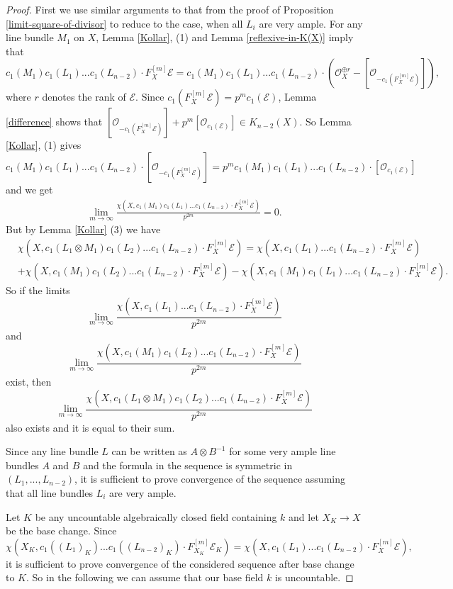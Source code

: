 \documentclass[twoside, 11pt]{article}
\theoremstyle{plain}
\theoremstyle{definition}
\theoremstyle{remark}
\newcommand{\cE}{{\mathcal E}}
\newcommand{\cO}{{\mathcal O}}
\begin{document}
\begin{proof}
First we use similar arguments to that from the proof of Proposition \ref{limit-square-of-divisor} to reduce to the case, when all $L_i$ are very ample.
For any line bundle $M_1$ on $X$, Lemma \ref{Kollar}, (1) and Lemma \ref{reflexive-in-K(X)} imply that
$$c_1(M_1)c_1(L_1)...c_1(L_{n-2}) \cdot {F_X^{[m]}\cE} =c_1(M_1)c_1(L_1)...c_1(L_{n-2}) \cdot 
(\cO_X^{\oplus r}-[\cO_{ -c_1(F_X^{[m]}\cE )}] ) ,$$
 where $r$ denotes the rank of $\cE$.
Since $c_1(F_X^{[m]}\cE ) =p^mc_1 (\cE)$, Lemma \ref{difference} shows that $[\cO_{ -c_1(F_X^{[m]}\cE )}] +p^m
[\cO_{c_1 (\cE)}]\in K_{n-2}(X)$. So Lemma  \ref{Kollar}, (1) gives
$$c_1(M_1)c_1(L_1)...c_1(L_{n-2}) \cdot  [\cO_{ -c_1(F_X^{[m]}\cE )}] =p^mc_1(M_1)c_1(L_1)...c_1(L_{n-2}) \cdot  [\cO_{ c_1(\cE )}] $$
and  we get
\begin{align*}
\lim _{m\to \infty}\frac{\chi (X,  c_1(M_1)c_1(L_1)...c_1(L_{n-2}) \cdot {F_X^{[m]}\cE} )}{p^{2m}}
=0.
\end{align*}
But by Lemma \ref{Kollar} (3) we have
\begin{align*}
&{  \chi (X, c_1(L_1\otimes M_1)c_1(L_2)...c_1(L_{n-2}) \cdot  {F_X^{[m]}\cE}  ) }
={  \chi (X, c_1(L_1)...c_1(L_{n-2}) \cdot {F_X^{[m]}\cE}   ) }\\
&+ \chi (X, c_1(M_1)c_1(L_2)...c_1(L_{n-2}) \cdot {F_X^{[m]}\cE}  ) - 
 {  \chi (X, c_1(M_1)c_1(L_1)...c_1(L_{n-2}) \cdot {F_X^{[m]}\cE}  ) }.
\end{align*}
So if  the limits $$\lim _{m\to \infty }\frac {  \chi (X, c_1(L_1)...c_1(L_{n-2}) \cdot {F_X^{[m]}\cE}  ) }{p^{2m}}$$ and 
$$\lim _{m\to \infty }\frac {  \chi (X, c_1(M_1)c_1(L_2)...c_1(L_{n-2}) \cdot {F_X^{[m]}\cE}  ) }{p^{2m}}$$
exist, then $$\lim _{m\to \infty }\frac {  \chi (X, c_1(L_1\otimes M_1)c_1(L_2)...c_1(L_{n-2}) \cdot {F_X^{[m]}\cE} ) }{p^{2m}}$$
also exists and it is equal to their sum.


Since any line bundle $L$ can be written as $A\otimes B^{-1}$ for some very ample line bundles $A$ and $B$ and the formula in the sequence is symmetric in $(L_1, ..., L_{n-2})$, it is sufficient to prove convergence of the sequence assuming that all line bundles $L_i$ are very ample.


Let $K$ be any uncountable algebraically closed field containing $k$ and let $X_K\to X$ be the base change. Since
$$ \chi (X_K, c_1((L_1)_K)...c_1((L_{n-2})_K) \cdot {F_{X_K}^{[m]}\cE_K} )= \chi (X, c_1(L_1)...c_1(L_{n-2}) \cdot {F_X^{[m]}\cE} ),$$ it is sufficient to prove convergence of the considered sequence after base change to $K$. So in the following we can assume that our base field $k$ is uncountable. 



\end{proof}
\end{document}
